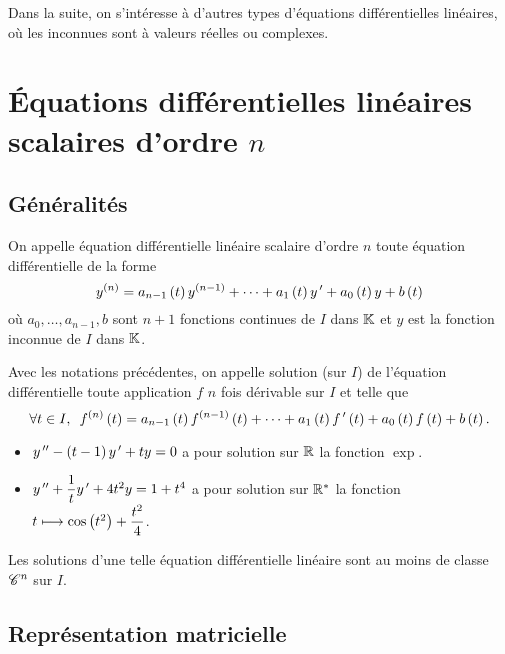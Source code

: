 Dans la suite, on s'intéresse à d'autres types d'équations différentielles linéaires, où les inconnues sont à valeurs réelles ou complexes.

\section{Équations différentielles linéaires scalaires d'ordre \(n\)}

\subsection{Généralités}

\begin{defi}
On appelle équation différentielle linéaire scalaire d'ordre \(n\) toute équation différentielle de la forme \[y^{\left(n\right)}=a_{n-1}\left(t\right)y^{\left(n-1\right)}+\dots+a_1\left(t\right)y^{\,\prime}+a_0\left(t\right)y+b\left(t\right)\] où \(a_0,\dots,a_{n-1},b\) sont \(n+1\) fonctions continues de \(I\) dans \(\mathbb{K}\) et \(y\) est la fonction inconnue de \(I\) dans \(\mathbb{K}\).
\end{defi}

\begin{defi}
Avec les notations précédentes, on appelle solution (sur \(I\)) de l'équation différentielle toute application \(f\) \(n\) fois dérivable sur \(I\) et telle que \[\quantifs{\forall t\in I}f\deriv{n}\paren{t}=a_{n-1}\paren{t}f\deriv{n-1}\paren{t}+\dots+a_1\paren{t}f\prim\paren{t}+a_0\paren{t}f\paren{t}+b\paren{t}.\]
\end{defi}

\begin{ex}
\begin{itemize}
    \item \(y^{\,\prime\prime}-\left(t-1\right)y^{\,\prime}+ty=0\) a pour solution sur \(\mathbb{R}\) la fonction \(\exp\). \\
    \item \(y^{\,\prime\prime}+\dfrac{1}{t}y^{\,\prime}+4t^2y=1+t^4\) a pour solution sur \(\mathbb{R}^*\) la fonction \(t\longmapsto\cos\left(t^2\right)+\dfrac{t^2}{4}\).
\end{itemize}
\end{ex}

\begin{prop}
Les solutions d'une telle équation différentielle linéaire sont au moins de classe \(\mathscr{C}^{n}\) sur \(I\).
\end{prop}

\subsection{Représentation matricielle}

